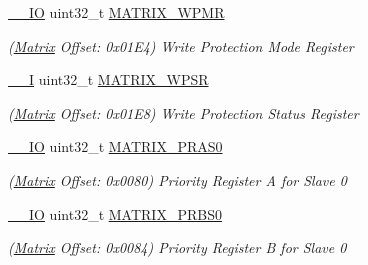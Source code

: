 \begin{DoxyCompactItemize}
\item 
\mbox{\label{structMatrix_aba87d5f5aa067b4aa4523b7acd2d0b8c}} 
\mbox{\hyperlink{core__cm7_8h_aec43007d9998a0a0e01faede4133d6be}{\+\_\+\+\_\+\+IO}} uint32\+\_\+t \mbox{\hyperlink{structMatrix_aba87d5f5aa067b4aa4523b7acd2d0b8c}{M\+A\+T\+R\+I\+X\+\_\+\+W\+P\+MR}}
\begin{DoxyCompactList}\small\item\em (\mbox{\hyperlink{structMatrix}{Matrix}} Offset\+: 0x01\+E4) Write Protection Mode Register \end{DoxyCompactList}\item 
\mbox{\label{structMatrix_ae55edad0db2cea7f6fc91059ae7a4794}} 
\mbox{\hyperlink{core__cm7_8h_af63697ed9952cc71e1225efe205f6cd3}{\+\_\+\+\_\+I}} uint32\+\_\+t \mbox{\hyperlink{structMatrix_ae55edad0db2cea7f6fc91059ae7a4794}{M\+A\+T\+R\+I\+X\+\_\+\+W\+P\+SR}}
\begin{DoxyCompactList}\small\item\em (\mbox{\hyperlink{structMatrix}{Matrix}} Offset\+: 0x01\+E8) Write Protection Status Register \end{DoxyCompactList}\item 
\mbox{\label{structMatrix_a441a2fe146f7c3449f23efc813d5ff4f}} 
\mbox{\hyperlink{core__cm7_8h_aec43007d9998a0a0e01faede4133d6be}{\+\_\+\+\_\+\+IO}} uint32\+\_\+t \mbox{\hyperlink{structMatrix_a441a2fe146f7c3449f23efc813d5ff4f}{M\+A\+T\+R\+I\+X\+\_\+\+P\+R\+A\+S0}}
\begin{DoxyCompactList}\small\item\em (\mbox{\hyperlink{structMatrix}{Matrix}} Offset\+: 0x0080) Priority Register A for Slave 0 \end{DoxyCompactList}\item 
\mbox{\label{structMatrix_a49da2beb53ca274f19e4bc6a93c074df}} 
\mbox{\hyperlink{core__cm7_8h_aec43007d9998a0a0e01faede4133d6be}{\+\_\+\+\_\+\+IO}} uint32\+\_\+t \mbox{\hyperlink{structMatrix_a49da2beb53ca274f19e4bc6a93c074df}{M\+A\+T\+R\+I\+X\+\_\+\+P\+R\+B\+S0}}
\begin{DoxyCompactList}\small\item\em (\mbox{\hyperlink{structMatrix}{Matrix}} Offset\+: 0x0084) Priority Register B for Slave 0 \end{DoxyCompactList}\item 

\end{DoxyCompactItemize}
